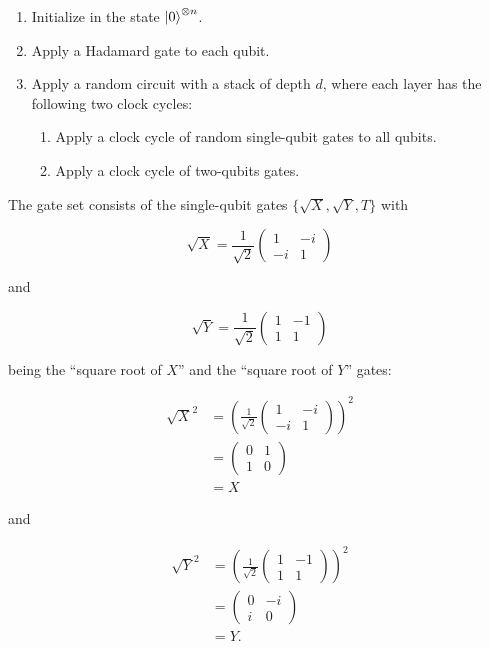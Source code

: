 \begin{enumerate}
  \item Initialize in the state $\Ket{0}^{\otimes n}$.
  \item Apply a Hadamard gate to each qubit.
  \item Apply a random circuit with a stack of depth $d$, where each layer has
    the following two clock cycles:
    \begin{enumerate}
      \item Apply a clock cycle of random single-qubit gates to all qubits.
        \item Apply a clock cycle of two-qubits gates.
    \end{enumerate}
\end{enumerate}

The gate set consists of the single-qubit gates $\{\sqrt{X}, \sqrt{Y}, T\}$ with

\begin{equation}
  \sqrt{X} = \frac{1}{\sqrt{2}} \begin{pmatrix}
    1 & - i \\
    - i & 1
    \end{pmatrix}
\end{equation}

and

\begin{equation}
  \sqrt{Y} = \frac{1}{\sqrt{2}} \begin{pmatrix}
    1 & -1  \\
    1 & 1 
  \end{pmatrix}
\end{equation}

being the ``square root of $X$'' and the ``square root of $Y$'' gates:

\begin{align}
  \sqrt{X}^2 &= \left(\frac{1}{\sqrt{2}} \begin{pmatrix}
    1 & - i \\
    - i & 1
  \end{pmatrix}\right)^2 \\
  &= \begin{pmatrix}
    0 & 1 \\
    1 & 0
  \end{pmatrix} \\
  &= X
\end{align}

and

\begin{align}
  \sqrt{Y}^2 &= \left(\frac{1}{\sqrt{2}} \begin{pmatrix}
    1 & -1 \\
    1 & 1
  \end{pmatrix}\right)^2 \\
  &= \begin{pmatrix}
    0 & -i \\
    i & 0
  \end{pmatrix} \\
  &= Y.
\end{align}

